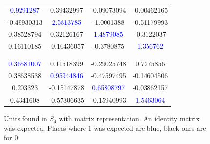 \begin{figure}
\center
\caption{Units found in $S_4$ with matrix representation. An identity matrix was expected. Places where 1 was expected are blue, black ones are for 0.}
\label{table:s4_matrix_unit}
\begin{tabular}{cccc}
\textcolor{blue}{0.9291287} & 0.39432997 & -0.09073094 & -0.00462165\\
-0.49930313 & \textcolor{blue}{2.5813785} & -1.0001388 & -0.51179993\\
0.38528794 & 0.32126167 & \textcolor{blue}{1.4879085} & -0.3122037\\
0.16110185 & -0.10436057 & -0.3780875 & \textcolor{blue}{1.356762}\\
 \\
\hline
\\
 \textcolor{blue}{0.36581007} & 0.11518399 & -0.29025748  & 0.7275856\\
0.38638538 & \textcolor{blue}{0.95944846} & -0.47597495 & -0.14604506\\
0.203323 & -0.15147878 & \textcolor{blue}{0.65808797} & -0.03862157\\
0.4341608 & -0.57306635 & -0.15940993 & \textcolor{blue}{1.5463064}
\end{tabular}
\end{figure}


